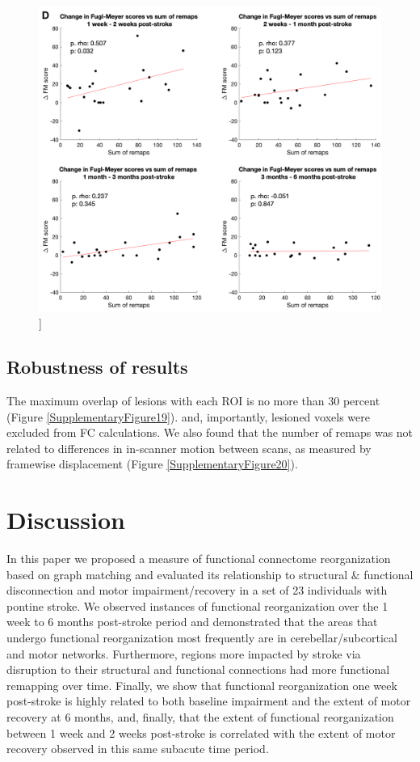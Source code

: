 \documentclass[phd,tocprelim]{cornell}
\renewcommand{\caption}[1]{\singlespacing\hangcaption{#1}\normalspacing}
\begin{document}
\null
\vfill
\clearpage
\null
\vfill
\begin{figure}[h!]
		\ContinuedFloat
		\captionsetup{labelformat=adja-page}
    \centering
    \includegraphics[width=\textwidth]{chapter1/Figure5D.png}
    \caption[]{}
\end{figure}
\null
\vfill
\clearpage
	\subsection{Robustness of results}
	The maximum overlap of lesions with each ROI is no more than 30 percent (Figure \ref{SupplementaryFigure19}). and, importantly, lesioned voxels were excluded from FC calculations. We also found that the number of remaps was not related to differences in in-scanner motion between scans, as measured by framewise displacement (Figure \ref{SupplementaryFigure20}).

\section{Discussion}
	In this paper we proposed a measure of functional connectome reorganization based on graph matching and evaluated its relationship to structural $\&$ functional disconnection and motor impairment/recovery in a set of 23 individuals with pontine stroke. We observed instances of functional reorganization over the 1 week to 6 months post-stroke period and demonstrated that the areas that undergo functional reorganization most frequently are in cerebellar/subcortical and motor networks. Furthermore, regions more impacted by stroke via disruption to their structural and functional connections had more functional remapping over time. Finally, we show that functional reorganization one week post-stroke is highly related to both baseline impairment and the extent of motor recovery at 6 months, and, finally, that the extent of functional reorganization between 1 week and 2 weeks post-stroke is correlated with the extent of motor recovery observed in this same subacute time period.
	
\end{document}
